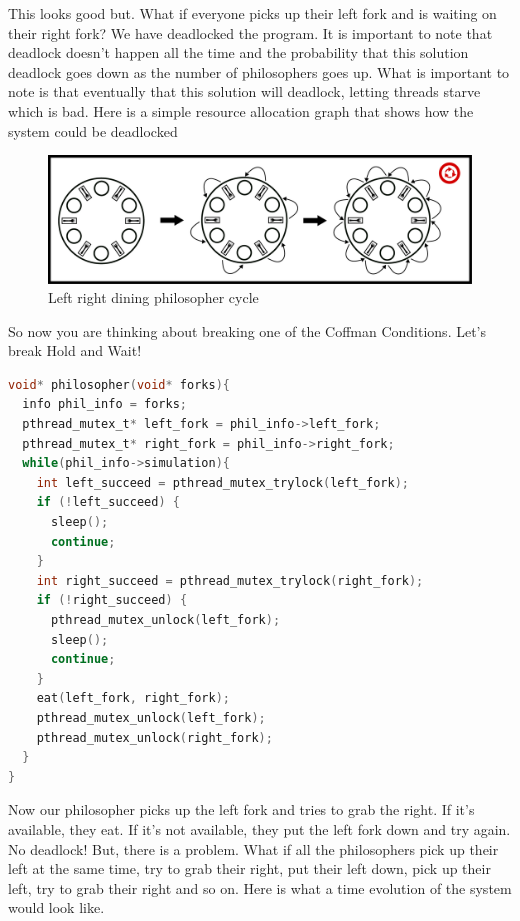 This looks good but.
What if everyone picks up their left fork and is waiting on their right fork? We have deadlocked the program.
It is important to note that deadlock doesn't happen all the time and the probability that this solution deadlock goes down as the number of philosophers goes up.
What is important to note is that eventually that this solution will deadlock, letting threads starve which is bad.
Here is a simple resource allocation graph that shows how the system could be deadlocked

\begin{figure}[H]
	\centering
	\includegraphics[width=.9\textwidth]{deadlock/drawings/dining_naive.eps}
	\caption{Left right dining philosopher cycle}
\end{figure}


So now you are thinking about breaking one of the Coffman Conditions.
Let's break Hold and Wait!

\begin{lstlisting}[language=C]
void* philosopher(void* forks){
  info phil_info = forks;
  pthread_mutex_t* left_fork = phil_info->left_fork;
  pthread_mutex_t* right_fork = phil_info->right_fork;
  while(phil_info->simulation){
    int left_succeed = pthread_mutex_trylock(left_fork);
    if (!left_succeed) {
      sleep();
      continue;
    }
    int right_succeed = pthread_mutex_trylock(right_fork);
    if (!right_succeed) {
      pthread_mutex_unlock(left_fork);
      sleep();
      continue;
    }
    eat(left_fork, right_fork);
    pthread_mutex_unlock(left_fork);
    pthread_mutex_unlock(right_fork);
  }
}
\end{lstlisting}

Now our philosopher picks up the left fork and tries to grab the right.
If it's available, they eat.
If it's not available, they put the left fork down and try again.
No deadlock! But, there is a problem.
What if all the philosophers pick up their left at the same time, try to grab their right, put their left down, pick up their left, try to grab their right and so on.
Here is what a time evolution of the system would look like.

